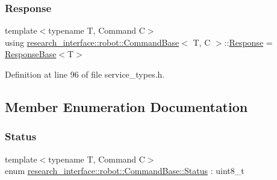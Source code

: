\subsubsection{\texorpdfstring{Response}{Response}}
{\footnotesize\ttfamily template$<$typename T, Command C$>$ \\
using \hyperlink{structresearch__interface_1_1robot_1_1CommandBase}{research\+\_\+interface\+::robot\+::\+Command\+Base}$<$ T, C $>$\+::\hyperlink{structresearch__interface_1_1robot_1_1CommandBase_ae8b503e2bc7d72e70b6eb08421e0d853}{Response} =  \hyperlink{structresearch__interface_1_1robot_1_1ResponseBase}{Response\+Base}$<$T$>$}



Definition at line 96 of file service\+\_\+types.\+h.



\subsection{Member Enumeration Documentation}
\mbox{\label{structresearch__interface_1_1robot_1_1CommandBase_a63ff74649dc636bd79dc0dd34fb84df5}} 
\subsubsection{\texorpdfstring{Status}{Status}}
{\footnotesize\ttfamily template$<$typename T, Command C$>$ \\
enum \hyperlink{structresearch__interface_1_1robot_1_1CommandBase_a63ff74649dc636bd79dc0dd34fb84df5}{research\+\_\+interface\+::robot\+::\+Command\+Base\+::\+Status} \+: uint8\+\_\+t\hspace{0.3cm}{\ttfamily [strong]}}

